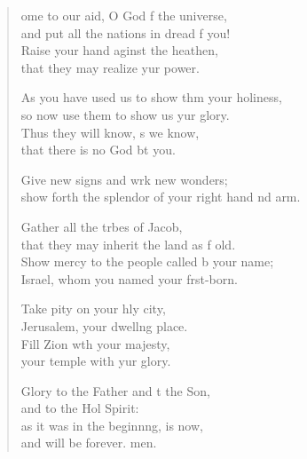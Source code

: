 \settowidth{\versewidth}{show forth the splendor of your right hand and arm.}
\begin{verse}%
  \begin{patverse}
ome to our aid, O God f the universe,\Med\\
and put all the nations in dread f you!\\
Raise your hand aginst the heathen,\Med\\
that they may realize yur power.

As you have used us to show thm your holiness,\Med\\
so now use them to show us yur glory.\\
Thus they will know, s we know,\Med\\
that there is no God bt you.

Give new signs and wrk new wonders;\Med\\
show forth the splendor of your right hand nd arm.

Gather all the tr\pointup{\i}bes of Jacob,\Med\\
that they may inherit the land as f old.\\
Show mercy to the people called b your name;\Med\\
Israel, whom you named your f\pointup{\i}rst-born.

Take pity on your hly city,\Med\\
Jerusalem, your dwell\pointup{\i}ng place.\\
Fill Zion w\pointup{\i}th your majesty,\Med\\
your temple with yur glory.

Glory to the Father and t the Son,\Med\\
and to the Hol Spirit:\\
as it was in the beginn\pointup{\i}ng, is now,\Med\\
and will be forever. men. 
  \end{patverse}
\end{verse}
